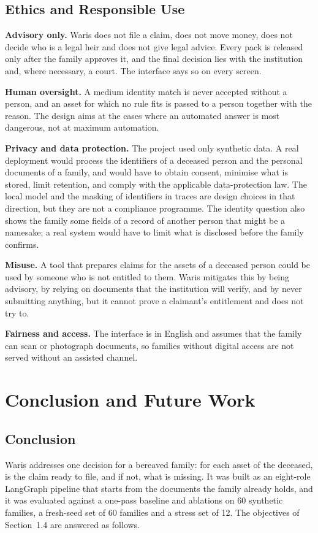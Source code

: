 \documentclass[12pt,a4paper,oneside]{report}
\begin{document}
\section{Ethics and Responsible Use}
\textbf{Advisory only.} Waris does not file a claim, does not move money, does not decide who is a legal heir and does not give legal advice. Every pack is released only after the family approves it, and the final decision lies with the institution and, where necessary, a court. The interface says so on every screen.

\textbf{Human oversight.} A medium identity match is never accepted without a person, and an asset for which no rule fits is passed to a person together with the reason. The design aims at the cases where an automated answer is most dangerous, not at maximum automation.

\textbf{Privacy and data protection.} The project used only synthetic data. A real deployment would process the identifiers of a deceased person and the personal documents of a family, and would have to obtain consent, minimise what is stored, limit retention, and comply with the applicable data-protection law. The local model and the masking of identifiers in traces are design choices in that direction, but they are not a compliance programme. The identity question also shows the family some fields of a record of another person that might be a namesake; a real system would have to limit what is disclosed before the family confirms.

\textbf{Misuse.} A tool that prepares claims for the assets of a deceased person could be used by someone who is not entitled to them. Waris mitigates this by being advisory, by relying on documents that the institution will verify, and by never submitting anything, but it cannot prove a claimant's entitlement and does not try to.

\textbf{Fairness and access.} The interface is in English and assumes that the family can scan or photograph documents, so families without digital access are not served without an assisted channel.


\chapter{Conclusion and Future Work}\label{ch:concl}
\section{Conclusion}
Waris addresses one decision for a bereaved family: for each asset of the deceased, is the claim ready to file, and if not, what is missing. It was built as an eight-role LangGraph pipeline that starts from the documents the family already holds, and it was evaluated against a one-pass baseline and ablations on 60 synthetic families, a fresh-seed set of 60 families and a stress set of 12. The objectives of Section~1.4 are answered as follows.
\end{document}
